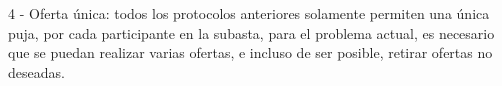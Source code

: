     4 - Oferta única: todos los protocolos anteriores solamente permiten una única puja, por cada participante
    en la subasta, para el problema actual, es necesario que se puedan realizar varias ofertas, e incluso de
    ser posible, retirar ofertas no deseadas.

